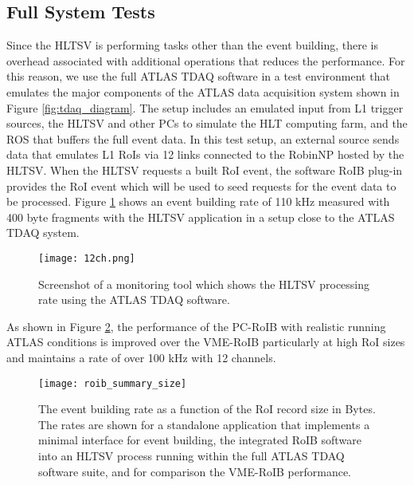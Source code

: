 \subsection{Full System Tests}\label{sec:perf_tdaq}

Since the HLTSV is performing tasks other than the event building, there is overhead associated with additional operations 
that reduces the performance. For this reason, we use the full ATLAS TDAQ software in a test environment that emulates the major components of the ATLAS data acquisition system shown in Figure \ref{fig:tdaq_diagram}. The setup includes an emulated input from L1 trigger sources, 
the HLTSV and other PCs to simulate the HLT computing farm, and the ROS that buffers the full event data. 
 In this test setup, an external source sends data that emulates L1 RoIs via 12 links connected to the 
RobinNP hosted by the HLTSV. When the HLTSV requests a built RoI event, the software RoIB plug-in provides the RoI event which will be used 
to seed requests for the event data to be processed.
 Figure \ref{fig:partition} shows an event building rate of 110 kHz measured with 400 byte fragments with the HLTSV application in a setup close to the ATLAS TDAQ system. 

\begin{figure}[tbp] %
\centering
\texttt{[image: 12ch.png]}
\caption{Screenshot of a monitoring tool which shows the HLTSV processing rate using the ATLAS TDAQ software.}
\label{fig:partition}
\end{figure}

As shown in Figure \ref{fig:roib_summary}, the performance of the PC-RoIB with realistic running ATLAS conditions is improved over the VME-RoIB particularly at high RoI sizes and maintains a rate of over 100 kHz with 12 channels. 

\begin{figure}[t!]
\centering
\texttt{[image: roib\_summary\_size]} 
\caption{The event building rate as a function of the RoI record size in Bytes. The rates are shown for a standalone application that implements 
  a minimal interface for event building, the integrated RoIB software into an HLTSV process running within the full ATLAS TDAQ software suite, and for comparison the VME-RoIB performance.}
\label{fig:roib_summary}
\end{figure} 

